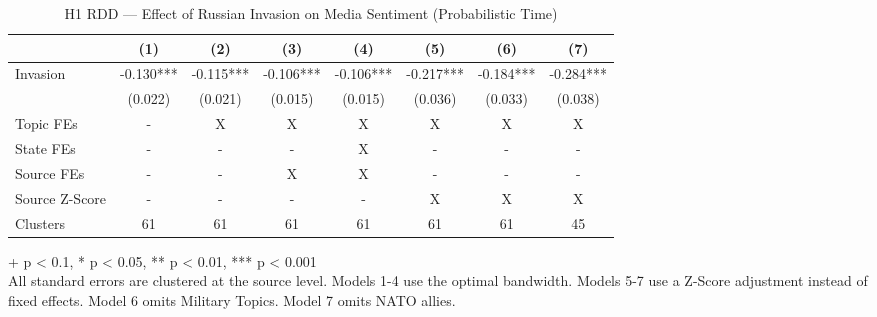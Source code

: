 \begin{table}[t]
\caption{\label{tab:table-01}H1 RDD — Effect of Russian Invasion on Media Sentiment (Probabilistic Time)}
\fontsize{12.0pt}{14.0pt}\selectfont
\begin{tabular*}{\linewidth}{@{\extracolsep{\fill}}lccccccc}
\toprule
  & (1) & (2) & (3) & (4) & (5) & (6) & (7) \\ 
\midrule\addlinespace[2.5pt]
Invasion & -0.130*** & -0.115*** & -0.106*** & -0.106*** & -0.217*** & -0.184*** & -0.284*** \\ 
 & (0.022) & (0.021) & (0.015) & (0.015) & (0.036) & (0.033) & (0.038) \\ 
Topic FEs & - & X & X & X & X & X & X \\ 
State FEs & - & - & - & X & - & - & - \\ 
Source FEs & - & - & X & X & - & - & - \\ 
Source Z-Score & - & - & - & - & X & X & X \\ 
Clusters & 61 & 61 & 61 & 61 & 61 & 61 & 45 \\ 
\bottomrule
\end{tabular*}
\begin{minipage}{\linewidth}
\vspace{.05em}
+ p < 0.1, * p < 0.05, ** p < 0.01, *** p < 0.001\\
All standard errors are clustered at the source level. Models 1-4 use the
optimal bandwidth. Models 5-7 use a Z-Score adjustment instead of fixed effects.
Model 6 omits Military Topics. Model 7 omits NATO allies.\\
\end{minipage}
\end{table}

